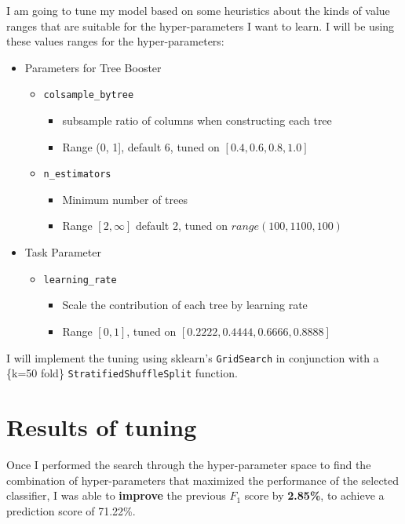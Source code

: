 I am going to tune my model based on some heuristics about the kinds of value ranges that are suitable for the hyper-parameters I want to learn. I will be using these values ranges for the hyper-parameters:

\begin{itemize}
\item Parameters for Tree Booster
    \begin{itemize}
        \item \texttt{colsample\_bytree}
        \begin{itemize}
            \item subsample ratio of columns when constructing each tree
            \item Range (0, 1], default 6, tuned on $[0.4, 0.6, 0.8, 1.0]$
        \end{itemize}
        \item \texttt{n\_estimators}
        \begin{itemize}
            \item Minimum number of trees
            \item Range $[2,\infty]$ default 2, tuned on $range(100, 1100, 100)$
        \end{itemize}

    \end{itemize}

\item Task Parameter
    \begin{itemize}
        \item \texttt{learning\_rate}
        \begin{itemize}
            \item Scale the contribution of each tree by learning rate
            \item Range $[0, 1]$, tuned on $[0.2222, 0.4444, 0.6666, 0.8888]$
        \end{itemize}
    \end{itemize}
\end{itemize}
I will implement the tuning using sklearn's \texttt{GridSearch} in conjunction with a \{k=50 fold\} \texttt{StratifiedShuffleSplit} function. 

\section*{Results of tuning}
Once I performed the search through the hyper-parameter space to find the combination of hyper-parameters that maximized the performance of the selected classifier, I was able to \textbf{improve} the previous $F_1$ score by \textbf{2.85\%}, to achieve a prediction score of 71.22\%.

